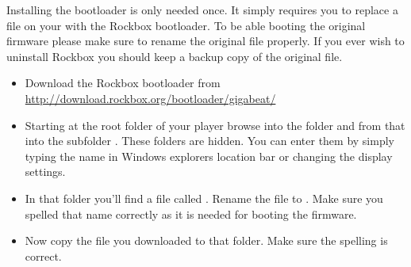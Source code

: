 
Installing the bootloader is only needed once. It simply requires you
to replace a file on your \dap{} with the Rockbox bootloader. To be able
booting the original firmware please make sure to rename the original file
properly. If you ever wish to uninstall Rockbox you should keep a backup copy
of the original file.

\begin{itemize}
\item Download the Rockbox bootloader from 
  \url{http://download.rockbox.org/bootloader/gigabeat/}
\item Starting at the root folder of your player browse into the folder
   and from that into the subfolder .
  These folders are hidden. You can enter them by simply typing the name in
  Windows explorers location bar or changing the display settings.
\item In that folder you'll find a file called . Rename
  the file to . Make sure you spelled that name
  correctly as it is needed for booting the \playerman{} firmware.
\item Now copy the file  you downloaded to that folder.
  Make sure the spelling is correct.
\end{itemize}

